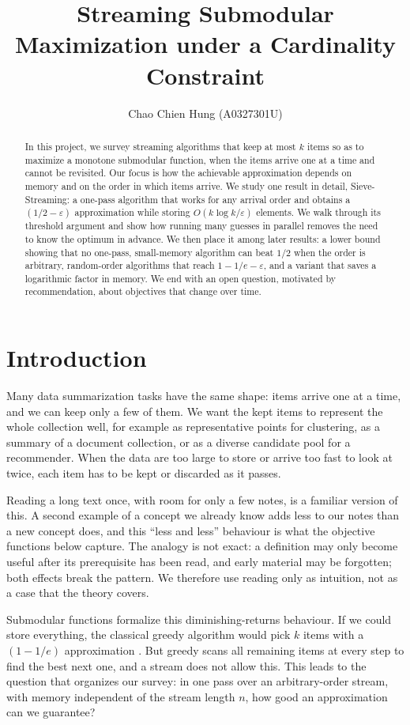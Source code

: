 \documentclass[10pt]{article}
\title{Streaming Submodular Maximization under a Cardinality Constraint}
\author{Chao Chien Hung (A0327301U)}
\date{}
\begin{document}
\maketitle

\begin{abstract}
In this project, we survey streaming algorithms that keep at most $k$ items so as to maximize a monotone submodular function, when the items arrive one at a time and cannot be revisited. Our focus is how the achievable approximation depends on memory and on the order in which items arrive. We study one result in detail, Sieve-Streaming: a one-pass algorithm that works for any arrival order and obtains a $(1/2-\varepsilon)$ approximation while storing $O(k\log k/\varepsilon)$ elements. We walk through its threshold argument and show how running many guesses in parallel removes the need to know the optimum in advance. We then place it among later results: a lower bound showing that no one-pass, small-memory algorithm can beat $1/2$ when the order is arbitrary, random-order algorithms that reach $1-1/e-\varepsilon$, and a variant that saves a logarithmic factor in memory. We end with an open question, motivated by recommendation, about objectives that change over time.
\end{abstract}

\section{Introduction}
Many data summarization tasks have the same shape: items arrive one at a time, and we can keep only a few of them. We want the kept items to represent the whole collection well, for example as representative points for clustering, as a summary of a document collection, or as a diverse candidate pool for a recommender. When the data are too large to store or arrive too fast to look at twice, each item has to be kept or discarded as it passes.

Reading a long text once, with room for only a few notes, is a familiar version of this. A second example of a concept we already know adds less to our notes than a new concept does, and this ``less and less'' behaviour is what the objective functions below capture. The analogy is not exact: a definition may only become useful after its prerequisite has been read, and early material may be forgotten; both effects break the pattern. We therefore use reading only as intuition, not as a case that the theory covers.

Submodular functions formalize this diminishing-returns behaviour. If we could store everything, the classical greedy algorithm would pick $k$ items with a $(1-1/e)$ approximation \cite{nemhauser1978analysis}. But greedy scans all remaining items at every step to find the best next one, and a stream does not allow this. This leads to the question that organizes our survey: in one pass over an arbitrary-order stream, with memory independent of the stream length $n$, how good an approximation can we guarantee?
\end{document}

